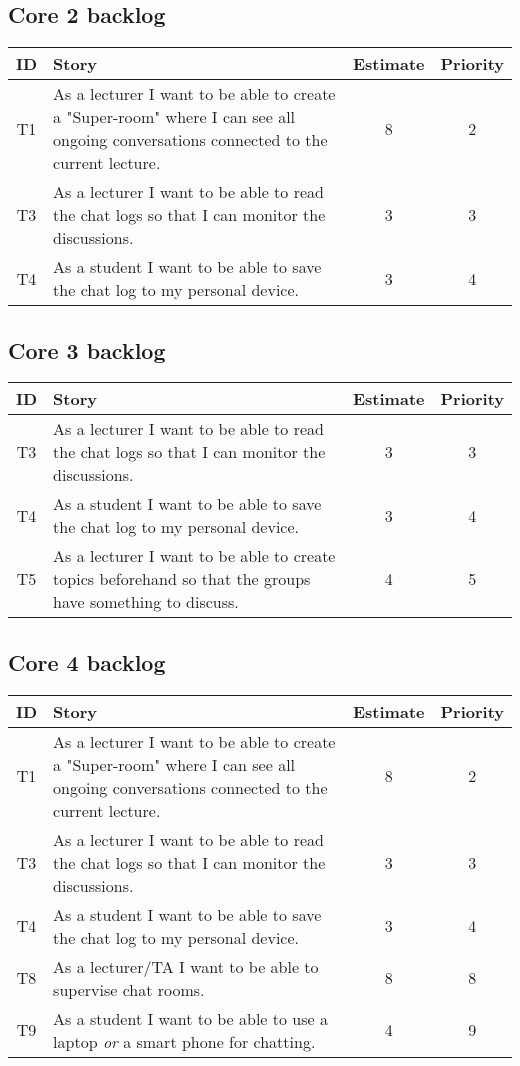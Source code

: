 \subsection{Core 2 backlog}
\begin{tabular}{ c | p{} | c | c}
     ID & Story & Estimate & Priority \\ \hline
     T1
     & As a lecturer I want to be able to create a "Super-room" where I can see all ongoing conversations connected to the current lecture.
     & 8 & 2 \\ \hline
     T3
     & As a lecturer I want to be able to read the chat logs so that I can monitor the discussions.
     & 3 & 3 \\ \hline
     T4
     & As a student I want to be able to save the chat log to my personal device.
     & 3 & 4 \\ \hline
\end{tabular}

\subsection{Core 3 backlog}
\begin{tabular}{ c | p{} | c | c}
     ID & Story & Estimate & Priority \\ \hline
     T3
     & As a lecturer I want to be able to read the chat logs so that I can monitor the discussions.
     & 3 & 3 \\ \hline
     T4
     & As a student I want to be able to save the chat log to my personal device.
     & 3 & 4 \\ \hline
     T5
     & As a lecturer I want to be able to create topics beforehand so that the groups have something to discuss.
     & 4 & 5 \\ \hline
     
    
\end{tabular}

\subsection{Core 4 backlog}
\begin{tabular}{ c | p{} | c | c}
     ID & Story & Estimate & Priority \\ \hline
     T1
     & As a lecturer I want to be able to create a "Super-room" where I can see all ongoing conversations connected to the current lecture.
     & 8 & 2 \\ \hline
     T3
     & As a lecturer I want to be able to read the chat logs so that I can monitor the discussions.
     & 3 & 3 \\ \hline
     T4
     & As a student I want to be able to save the chat log to my personal device.
     & 3 & 4 \\ \hline
     T8
     & As a lecturer/TA I want to be able to supervise chat rooms. 
     & 8 & 8 \\ \hline
     T9
     & As a student I want to be able to use a laptop \emph{or} a smart phone for chatting. 
     & 4 & 9 \\ \hline
\end{tabular}

